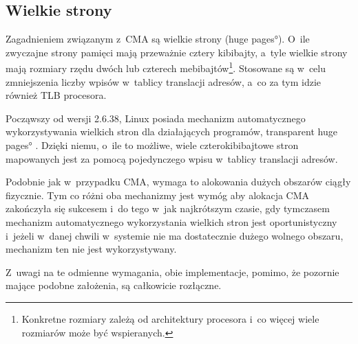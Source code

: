 \subsection{Wielkie strony}

Zagadnieniem związanym z~CMA są wielkie strony (\ang{huge pages}).
O~ile zwyczajne strony pamięci mają przeważnie cztery kibibajty,
a~tyle wielkie strony mają rozmiary rzędu dwóch lub czterech
mebibajtów\footnote{Konkretne rozmiary zależą od architektury
  procesora i~co więcej wiele rozmiarów może być wspieranych.}.
Stosowane są w~celu zmniejszenia liczby wpisów w~tablicy translacji
adresów, a~co za tym idzie również TLB procesora.

Począwszy od wersji 2.6.38, Linux posiada mechanizm automatycznego
wykorzystywania wielkich stron dla działających programów,
\ang{transparent huge pages} \cite{bib:v2.6.38}.  Dzięki niemu,
o~ile to możliwe, wiele czterokibibajtowe stron mapowanych jest za
pomocą pojedynczego wpisu w~tablicy translacji adresów.

Podobnie jak w~przypadku CMA, wymaga to alokowania dużych obszarów
ciągły fizycznie.  Tym co różni oba mechanizmy jest wymóg aby alokacja
CMA zakończyła się sukcesem i~do tego w~jak najkrótszym czasie, gdy
tymczasem mechanizm automatycznego wykorzystania wielkich stron jest
oportunistyczny i~jeżeli w~danej chwili w~systemie nie ma dostatecznie
dużego wolnego obszaru, mechanizm ten nie jest wykorzystywany.

Z~uwagi na te odmienne wymagania, obie implementacje, pomimo, że
pozornie mające podobne założenia, są całkowicie rozłączne.
